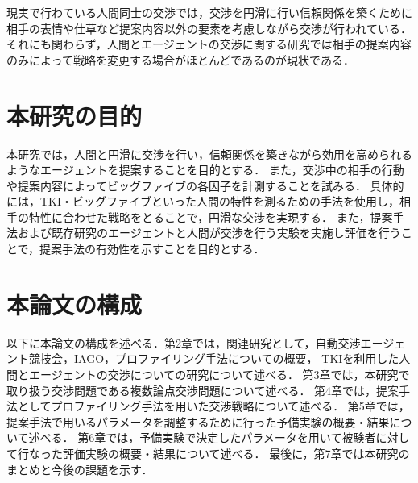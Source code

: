 現実で行わている人間同士の交渉では，交渉を円滑に行い信頼関係を築くために相手の表情や仕草など提案内容以外の要素を考慮しながら交渉が行われている．それにも関わらず，人間とエージェントの交渉に関する研究では相手の提案内容のみによって戦略を変更する場合がほとんどであるのが現状である．

\section{本研究の目的}
本研究では，人間と円滑に交渉を行い，信頼関係を築きながら効用を高められるようなエージェントを提案することを目的とする．
また，交渉中の相手の行動や提案内容によってビッグファイブの各因子を計測することを試みる．
具体的には，TKI・ビッグファイブといった人間の特性を測るための手法を使用し，相手の特性に合わせた戦略をとることで，円滑な交渉を実現する．
また，提案手法および既存研究のエージェントと人間が交渉を行う実験を実施し評価を行うことで，提案手法の有効性を示すことを目的とする．

\section{本論文の構成}
以下に本論文の構成を述べる．第2章では，関連研究として，自動交渉エージェント競技会，IAGO，プロファイリング手法についての概要，
TKIを利用した人間とエージェントの交渉についての研究について述べる．
第3章では，本研究で取り扱う交渉問題である複数論点交渉問題について述べる．
第4章では，提案手法としてプロファイリング手法を用いた交渉戦略について述べる．
第5章では，提案手法で用いるパラメータを調整するために行った予備実験の概要・結果について述べる．
第6章では，予備実験で決定したパラメータを用いて被験者に対して行なった評価実験の概要・結果について述べる．
最後に，第7章では本研究のまとめと今後の課題を示す．

